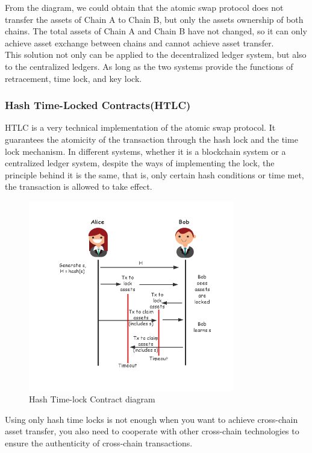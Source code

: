 \noindent From the diagram, we could obtain that the atomic swap protocol does not transfer the assets of Chain A to Chain B, but only the assets ownership of both chains. The total assets of Chain A and Chain B have not changed, so it can only achieve asset exchange between chains and cannot achieve asset transfer.\\
\noindent This solution not only can be applied to the decentralized ledger system, but also to the centralized ledgers. As long as the two systems provide the functions of retracement, time lock, and key lock.

\subsubsection{Hash Time-Locked Contracts(HTLC)}
\noindent HTLC is a very technical implementation of the atomic swap protocol. It guarantees the atomicity of the transaction through the hash lock and the time lock mechanism. In different systems, whether it is a blockchain system or a centralized ledger system, despite the ways of implementing the lock, the principle behind it is the same, that is, only certain hash conditions or time met, the transaction is allowed to take effect.

        \begin{figure}[H]
        \includegraphics[width=0.8\textwidth]{./figures/Hashlock.png}
        \centering
        \caption{Hash Time-lock Contract diagram}%
        \centering
        \label{fig:hash}
        \end{figure}
\noindent Using only hash time locks is not enough when you want to achieve cross-chain asset transfer, you also need to cooperate with other cross-chain technologies to ensure the authenticity of cross-chain transactions.


